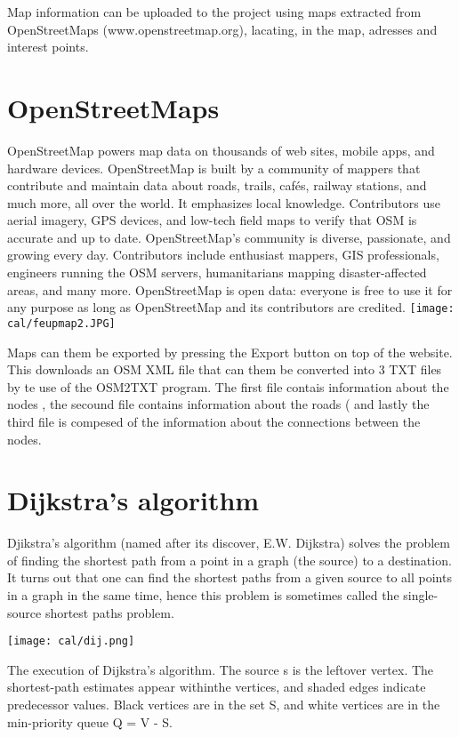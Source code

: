 \documentclass{article}
\begin{document}
Map information can be uploaded to the project using maps extracted from OpenStreetMaps (www.openstreetmap.org), lacating, in the map, adresses and interest points.
\newpage
\section{OpenStreetMaps}
OpenStreetMap powers map data on thousands of web sites, mobile apps, and hardware devices.
OpenStreetMap is built by a community of mappers that contribute and maintain data about roads, trails, cafés, railway stations, and much more, all over the world.
It emphasizes local knowledge. Contributors use aerial imagery, GPS devices, and low-tech field maps to verify that OSM is accurate and up to date.
OpenStreetMap's community is diverse, passionate, and growing every day. Contributors include enthusiast mappers, GIS professionals, engineers running the OSM servers, humanitarians mapping disaster-affected areas, and many more. 
OpenStreetMap is open data: everyone is free to use it for any purpose as long as OpenStreetMap and its contributors are credited.
\texttt{[image: cal/feupmap2.JPG]} 

Maps can them be exported by pressing the Export button on top of the website. This downloads an OSM XML file that can them be converted into 3 TXT files by te use of the OSM2TXT program. The first file contais information about the nodes , the secound file contains information about the roads ( and lastly the third file is compesed of the information about the connections between the nodes.


\newpage
\section{Dijkstra's algorithm}
Djikstra's algorithm (named after its discover, E.W. Dijkstra) solves the problem of finding the shortest path from a point in a graph (the source) to a destination. It turns out that one can find the shortest paths from a given source to all points in a graph in the same time, hence this problem is sometimes called the single-source shortest paths problem.

\texttt{[image: cal/dij.png]} 

The execution of Dijkstra's algorithm. The source s is the leftover vertex. The shortest-path estimates appear withinthe vertices, and shaded edges indicate predecessor values. Black vertices are in the set S, and white vertices are in the min-priority queue Q = V - S.
\end{document}
